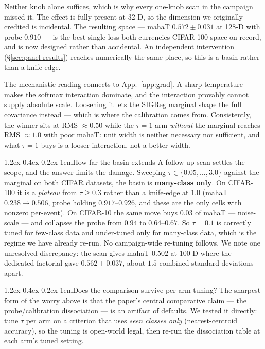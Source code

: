 \documentclass{article}
\makeatletter
\renewcommand\paragraph{\@startsection{paragraph}{4}{\z@}%
  {1.2ex \@plus 0.4ex \@minus 0.2ex}{-1em}{\normalsize\bf}}
\makeatother
\begin{document}
Neither knob alone suffices, which is why every one-knob scan in the campaign
missed it. The effect is fully present at 32-D, so the dimension we originally
credited is incidental. The resulting space --- mahaT $0.572\pm0.031$ at 128-D
with probe $0.910$ --- is the best single-loss both-currencies CIFAR-100 space
on record, and is now designed rather than accidental. An independent
intervention (\S\ref{sec:panel-results}) reaches numerically the same place, so
this is a basin rather than a knife-edge.

The mechanistic reading connects to App.~\ref{app:grad}. A sharp temperature
makes the softmax interaction dominate, and the interaction provably cannot
supply absolute scale. Loosening it lets the SIGReg marginal shape the full
covariance instead --- which is where the calibration comes from. Consistently,
the winner sits at RMS $\approx0.50$ while the $\tau=1$ arm \emph{without} the
marginal reaches RMS $\approx1.0$ with poor mahaT: unit width is neither
necessary nor sufficient, and what $\tau=1$ buys is a looser interaction, not a
better width.

\paragraph{How far the basin extends}
A follow-up scan settles the scope, and the answer limits the damage. Sweeping
$\tau\in\{0.05,\ldots,3.0\}$ against the marginal on both CIFAR datasets, the
basin is \textbf{many-class only}. On CIFAR-100 it is a \emph{plateau} from
$\tau\ge0.3$ rather than a knife-edge at $1.0$ (mahaT $0.238\to0.506$, probe
holding $0.917$--$0.926$, and these are the only cells with nonzero per-event).
On CIFAR-10 the same move buys $0.03$ of mahaT --- noise-scale --- and
collapses the probe from $0.94$ to $0.64$--$0.67$. So $\tau=0.1$ is correctly
tuned for few-class data and under-tuned only for many-class data, which is the
regime we have already re-run. No campaign-wide re-tuning follows. We note one
unresolved discrepancy: the scan gives mahaT $0.502$ at 100-D where the
dedicated factorial gave $0.562\pm0.037$, about $1.5$ combined standard
deviations apart.

\paragraph{Does the comparison survive per-arm tuning?}
The sharpest form of the worry above is that the paper's central comparative
claim --- the probe/calibration dissociation --- is an artifact of defaults. We
tested it directly: tune $\tau$ per arm on a criterion that uses \emph{seen
classes only} (nearest-centroid accuracy), so the tuning is open-world legal,
then re-run the dissociation table at each arm's tuned setting.
\end{document}
